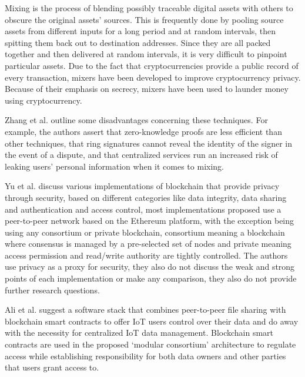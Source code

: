 Mixing is the process of blending possibly traceable digital assets
with others to obscure the original assets' sources. This is frequently done
by pooling source assets from different inputs for a long period and at random
intervals, then spitting them back out to destination addresses. Since they
are all packed together and then delivered at random intervals, it is very
difficult to pinpoint particular assets. Due to the fact that cryptocurrencies
provide a public record of every transaction, mixers have been developed
to improve cryptocurrency privacy. Because of their emphasis on secrecy,
mixers have been used to launder money using cryptocurrency.

Zhang et al. \cite{zhang2019security} outline some disadvantages concerning
these techniques. For example, the authors assert that zero-knowledge proofs
are less efficient than other techniques, that ring signatures cannot reveal
the identity of the signer in the event of a dispute, and that centralized
services run an increased risk of leaking users' personal information when
it comes to mixing.

Yu et al. \cite{yu2018blockchain} discuss various implementations of blockchain
that provide privacy through security, based on different categories like
data integrity, data sharing and authentication and access control, most
implementations proposed use a peer-to-peer network based on the Ethereum
platform, with the exception being using any consortium or private blockchain,
consortium meaning a blockchain where consensus is managed by a pre-selected set
of nodes and private meaning access permission and read/write authority are
tightly controlled. The authors use privacy as a proxy for security, they also
do not discuss the weak and strong points of each implementation or make any
comparison, they also do not provide further research questions.


Ali et al. \cite{AliIoT} suggest a software stack that combines peer-to-peer
file sharing with blockchain smart contracts to offer IoT users control
over their data and do away with the necessity for centralized IoT data
management. Blockchain smart contracts are used in the proposed `modular
consortium' architecture to regulate access while establishing responsibility
for both data owners and other parties that users grant access to.

